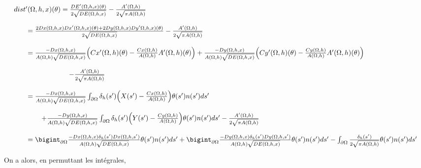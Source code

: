 \documentclass[11pt,a4paper]{article}
\begin{document}
\begin{equation}
\label{eq:derDist}
\begin{array}{l}
dist'(\Omega,h,x)(\theta)=\frac{DE'(\Omega,h,x)(\theta)}{2\sqrt{DE(\Omega,h,x)}}-\frac{A'(\Omega,h)}{2\sqrt{\pi A(\Omega,h)}} \\
\\
\qquad= \frac{2Dx(\Omega,h,x)Dx'(\Omega,h,x)(\theta)+2Dy(\Omega,h,x)Dy'\Omega,h,x)(\theta)}{2\sqrt{DE(\Omega,h,x)}}-\frac{A'(\Omega,h)}{2\sqrt{\pi A(\Omega,h)}}\\
\\
\qquad = \frac{-Dx(\Omega,h,x)}{A(\Omega,h)\sqrt{DE(\Omega,h,x)}}\Big(Cx'(\Omega,h)(\theta)-\frac{Cx(\Omega,h)}{A(\Omega,h)}A'(\Omega,h)(\theta)\Big)+\frac{-Dy(\Omega,h,x)}{A(\Omega,h)\sqrt{DE(\Omega,h,x)}}\Big(Cy'(\Omega,h)(\theta)-\frac{Cy(\Omega,h)}{A(\Omega,h)}A'(\Omega,h)(\theta)\Big)\\
\\
\qquad \qquad \qquad \qquad -\frac{A'(\Omega,h)}{2\sqrt{\pi A(\Omega,h)}}  \\
\\
\qquad =
\frac{-Dx(\Omega,h,x)}{A(\Omega,h)\sqrt{DE(\Omega,h,x)}}\int_{\partial\Omega}\delta_h(s')\Big(X(s')-\frac{Cx(\Omega,h)}{A(\Omega,h)}\Big)\theta(s')n(s')ds'\\
\\
\qquad \qquad  +\frac{-Dy(\Omega,h,x)}{A(\Omega,h)\sqrt{DE(\Omega,h,x)}}\int_{\partial\Omega}\delta_h(s')\Big(Y(s')-\frac{Cy(\Omega,h)}{A(\Omega,h)}\Big)\theta(s')n(s')ds'-\frac{A'(\Omega,h)}{2\sqrt{\pi A(\Omega,h)}}\\
\\
\qquad =\bigint_{\partial\Omega}\frac{-Dx(\Omega,h,x)\delta_h(s')Dx(\Omega,h,s')}{A(\Omega,h)\sqrt{DE(\Omega,h,x)}}\theta(s')n(s')ds'+\bigint_{\partial\Omega}\frac{-Dy(\Omega,h,x)\delta_h(s')Dy(\Omega,h,s')}{A(\Omega,h)\sqrt{DE(\Omega,h,x)}}\theta(s')n(s')ds'-\int_{\partial\Omega}\frac{\delta_h(s')}{2\sqrt{\pi A(\Omega,h)}}\theta(s')n(s')ds'
\end{array} 
\end{equation}

On a alors, en permuttant les intégrales,
\end{document}
